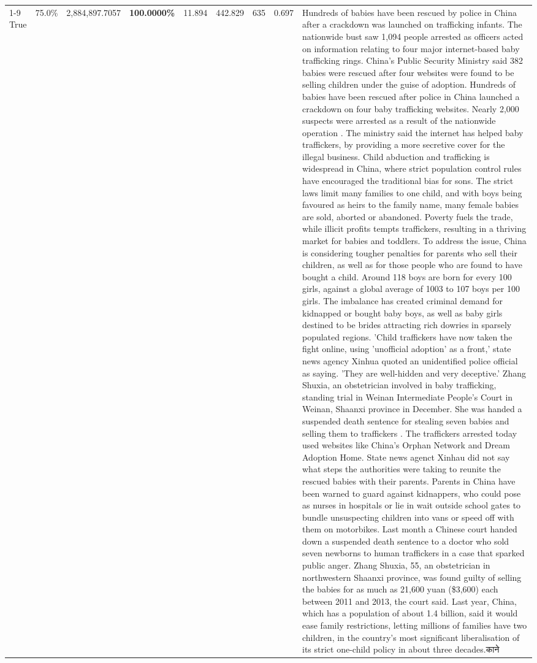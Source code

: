 \begin{table}[H]
\begin{tabular}{lllrlllll}
\cline{1-9}
True & 75.0\% & 2,884,897.7057 & \bfseries \color{red} 100.0000\% & 11.894 & 442.829 & 635 & 0.697 & Hundreds of babies have been rescued by police in China after a crackdown was launched on trafficking infants. The nationwide bust saw 1,094 people arrested as officers acted on information relating to four major internet-based baby trafficking rings. China's Public Security Ministry said 382 babies were rescued after four websites were found to be selling children under the guise of adoption. Hundreds of babies have been rescued after police in China launched a crackdown on four baby trafficking websites. Nearly 2,000 suspects were arrested as a result of the nationwide operation . The ministry said the internet has helped baby traffickers, by providing a more secretive cover for the illegal business. Child abduction and trafficking is widespread in China, where strict population control rules have encouraged the traditional bias for sons. The strict laws limit many families to one child, and with boys being favoured as heirs to the family name, many female babies are sold, aborted or abandoned. Poverty fuels the trade, while illicit profits tempts traffickers, resulting in a thriving market for babies and toddlers. To address the issue, China is considering tougher penalties for parents who sell their children, as well as for those people who are found to have bought a child. Around 118 boys are born for every 100 girls, against a global average of 1003 to 107 boys per 100 girls. The imbalance has created criminal demand for kidnapped or bought baby boys, as well as baby girls destined to be brides attracting rich dowries in sparsely populated regions. 'Child traffickers have now taken the fight online, using 'unofficial adoption' as a front,' state news agency Xinhua quoted an unidentified police official as saying. 'They are well-hidden and very deceptive.' Zhang Shuxia, an obstetrician involved in baby trafficking, standing trial in Weinan Intermediate People's Court in Weinan, Shaanxi province in December. She was handed a suspended death sentence for stealing seven babies and selling them to traffickers . The traffickers arrested today used websites like China's Orphan Network and Dream Adoption Home. State news agenct Xinhau did not say what steps the authorities were taking to reunite the rescued babies with their parents. Parents in China have been warned to guard against kidnappers, who could pose as nurses in hospitals or lie in wait outside school gates to bundle unsuspecting children into vans or speed off with them on motorbikes. Last month a Chinese court handed down a suspended death sentence to a doctor who sold seven newborns to human traffickers in a case that sparked public anger. Zhang Shuxia, 55, an obstetrician in northwestern Shaanxi province, was found guilty of selling the babies for as much as 21,600 yuan (\$3,600) each between 2011 and 2013, the court said. Last year, China, which has a population of about 1.4 billion, said it would ease family restrictions, letting millions of families have two children, in the country's most significant liberalisation of its strict one-child policy in about three decades.काने \\

\end{tabular}
\end{table}

